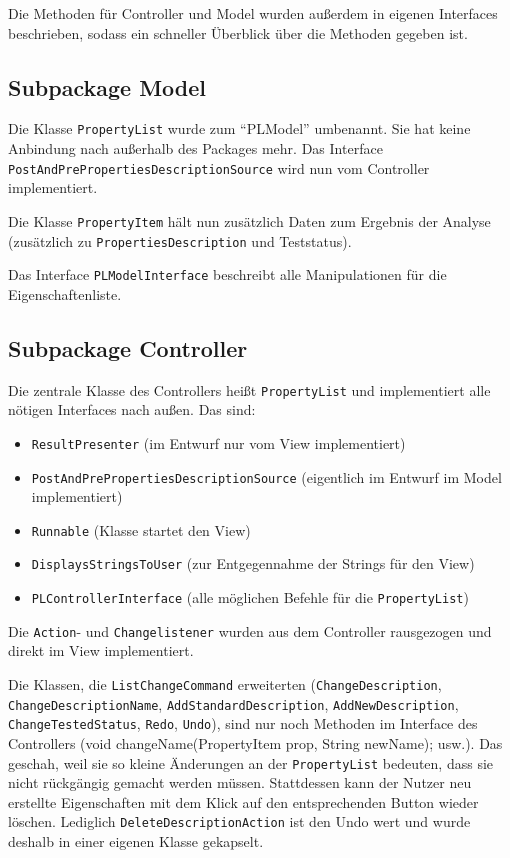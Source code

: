 \documentclass[a4paper]{scrreprt}
\begin{document}
Die Methoden für Controller und Model wurden außerdem in eigenen Interfaces beschrieben, sodass ein schneller Überblick über die Methoden gegeben ist.

\subsection{Subpackage Model}
Die Klasse \verb!PropertyList! wurde zum "`PLModel"' umbenannt. Sie hat keine Anbindung nach außerhalb des Packages mehr. Das Interface \verb!PostAndPrePropertiesDescriptionSource! wird nun vom Controller implementiert.

Die Klasse \verb!PropertyItem! hält nun zusätzlich Daten zum Ergebnis der Analyse (zusätzlich zu \verb!PropertiesDescription! und Teststatus).

Das Interface \verb!PLModelInterface! beschreibt alle Manipulationen für die Eigenschaftenliste.

\subsection{Subpackage Controller}
Die zentrale Klasse des Controllers heißt \verb!PropertyList! und implementiert alle nötigen Interfaces nach außen. Das sind:
\begin{itemize}
	\item \verb!ResultPresenter! (im Entwurf nur vom View implementiert)
	\item \verb!PostAndPrePropertiesDescriptionSource! (eigentlich im Entwurf im Model implementiert)
	\item \verb!Runnable! (Klasse startet den View)
	\item \verb!DisplaysStringsToUser! (zur Entgegennahme der Strings für den View)
	\item \verb!PLControllerInterface! (alle möglichen Befehle für die \verb!PropertyList!)
\end{itemize}
Die \verb!Action!- und \verb!Changelistener! wurden aus dem Controller rausgezogen und direkt im View implementiert.

Die Klassen, die \verb!ListChangeCommand! erweiterten (\verb!ChangeDescription!, \verb!ChangeDescriptionName!, \verb!AddStandardDescription!, \verb!AddNewDescription!, \verb!ChangeTestedStatus!, \verb!Redo!, \verb!Undo!), sind nur noch Methoden im Interface des Controllers (void changeName(PropertyItem prop, String newName); usw.). Das geschah, weil sie so kleine Änderungen an der \verb!PropertyList! bedeuten, dass sie nicht rückgängig gemacht werden müssen. Stattdessen kann der Nutzer neu erstellte Eigenschaften mit dem Klick auf den entsprechenden Button wieder löschen. Lediglich \verb!DeleteDescriptionAction! ist den Undo wert und wurde deshalb in einer eigenen Klasse gekapselt.
\end{document}
